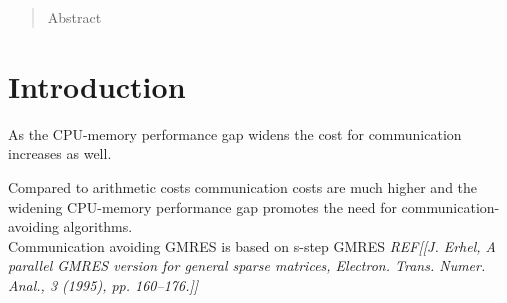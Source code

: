 \documentclass{scrartcl}
\begin{document}
\pagebreak

\tableofcontents

\pagebreak

\begin{abstract}
Abstract
\end{abstract}
\section{Introduction}
As the CPU-memory performance gap widens the cost for communication increases as well.

Compared to arithmetic costs communication costs are much higher and the widening CPU-memory performance gap promotes the need for communication-avoiding algorithms.\\

Communication avoiding GMRES is based on s-step GMRES \textit{REF[[J. Erhel, A parallel GMRES version for general sparse matrices, Electron. Trans. Numer. Anal., 3 (1995), pp. 160–176.]]}

\newpage
\end{document}

